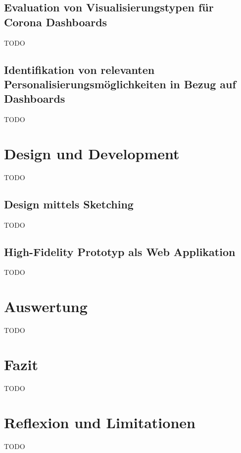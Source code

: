 \documentclass[12pt, oneside]{article}
\begin{document}
\subsection{Evaluation von Visualisierungstypen für Corona Dashboards}
TODO

\subsection{Identifikation von relevanten Personalisierungsmöglichkeiten in Bezug auf Dashboards}
TODO

\clearpage
\section{Design und Development}
TODO

\subsection{Design mittels Sketching}
TODO

\subsection{High-Fidelity Prototyp als Web Applikation}
TODO

\clearpage
\section{Auswertung}
TODO

\clearpage
\section{Fazit}
TODO

\clearpage
\section{Reflexion und Limitationen}
TODO


\clearpage



\clearpage
\end{document}
